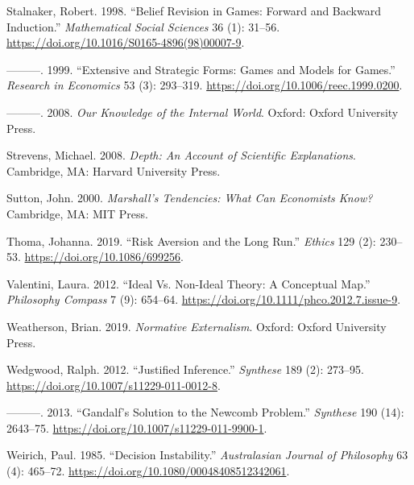 \documentclass[
  12pt,
  letterpaper,
  DIV=11,
  numbers=noendperiod]{scrreprt}
\newlength{\cslhangindent}
\newlength{\cslentryspacingunit} %
\newenvironment{CSLReferences}[2] %
 {%
  \setlength{\parindent}{0pt}
  \ifodd #1
  \let\oldpar\par
  \def\par{\hangindent=\cslhangindent\oldpar}
  \fi
  \setlength{\parskip}{#2\cslentryspacingunit}
 }%
 {}
\begin{document}
\begin{CSLReferences}{1}{0}
\leavevmode{}%
Stalnaker, Robert. 1998. {``Belief Revision in Games: Forward and
Backward Induction.''} \emph{Mathematical Social Sciences} 36 (1):
31--56. \url{https://doi.org/10.1016/S0165-4896(98)00007-9}.

\leavevmode{}%
---------. 1999. {``Extensive and Strategic Forms: Games and Models for
Games.''} \emph{Research in Economics} 53 (3): 293--319.
\url{https://doi.org/10.1006/reec.1999.0200}.

\leavevmode{}%
---------. 2008. \emph{Our Knowledge of the Internal World}. Oxford:
Oxford University Press.

\leavevmode{}%
Strevens, Michael. 2008. \emph{Depth: An Account of Scientific
Explanations}. Cambridge, MA: Harvard University Press.

\leavevmode{}%
Sutton, John. 2000. \emph{Marshall's Tendencies: What Can Economists
Know?} Cambridge, MA: {MIT} Press.

\leavevmode{}%
Thoma, Johanna. 2019. {``Risk Aversion and the Long Run.''}
\emph{Ethics} 129 (2): 230--53. \url{https://doi.org/10.1086/699256}.

\leavevmode{}%
Valentini, Laura. 2012. {``Ideal Vs. Non-Ideal Theory: A Conceptual
Map.''} \emph{Philosophy Compass} 7 (9): 654--64.
\url{https://doi.org/10.1111/phco.2012.7.issue-9}.

\leavevmode{}%
Weatherson, Brian. 2019. \emph{Normative Externalism}. Oxford: Oxford
University Press.

\leavevmode{}%
Wedgwood, Ralph. 2012. {``Justified Inference.''} \emph{Synthese} 189
(2): 273--95. \url{https://doi.org/10.1007/s11229-011-0012-8}.

\leavevmode{}%
---------. 2013. {``Gandalf's Solution to the Newcomb Problem.''}
\emph{Synthese} 190 (14): 2643--75.
\url{https://doi.org/10.1007/s11229-011-9900-1}.

\leavevmode{}%
Weirich, Paul. 1985. {``Decision Instability.''} \emph{Australasian
Journal of Philosophy} 63 (4): 465--72.
\url{https://doi.org/10.1080/00048408512342061}.


\end{CSLReferences}
\end{document}
